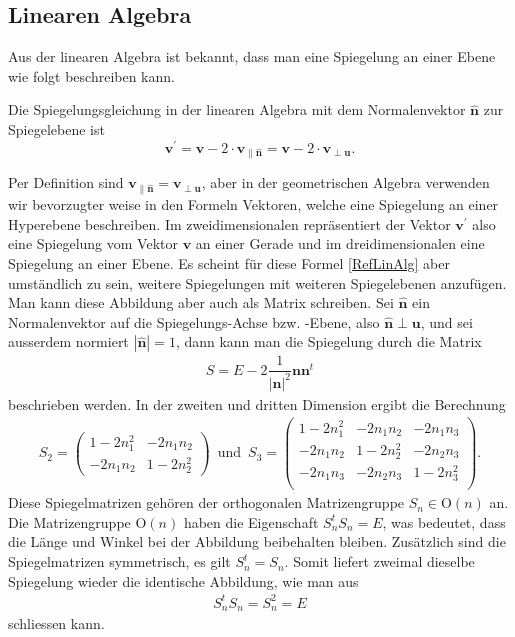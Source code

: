 \subsection{Linearen Algebra}
Aus der linearen Algebra ist bekannt, dass man eine Spiegelung an einer Ebene wie folgt beschreiben kann.
\begin{definition}
	Die Spiegelungsgleichung in der linearen Algebra mit dem Normalenvektor $\mathbf{\hat{n}}$ zur Spiegelebene ist
	\begin{equation} \label{RefLinAlg}
		\mathbf{v^{'}} = \mathbf{v} - 2 \cdot \mathbf{v_{\parallel \hat{n}}} = \mathbf{v} - 2 \cdot \mathbf{v_{\perp u}}.
	\end{equation}
\end{definition}
Per Definition sind $\mathbf{v_{\parallel \hat{n}}} = \mathbf{v_{\perp u}}$, aber in der geometrischen Algebra verwenden wir bevorzugter weise in den Formeln Vektoren, welche eine Spiegelung an einer Hyperebene beschreiben. Im zweidimensionalen repräsentiert der Vektor $\mathbf{v^{'}}$ also eine Spiegelung vom Vektor $\mathbf{v}$ an einer Gerade und im dreidimensionalen eine Spiegelung an einer Ebene.
Es scheint für diese Formel \eqref{RefLinAlg} aber umständlich zu sein, weitere Spiegelungen mit weiteren Spiegelebenen anzufügen. Man kann diese Abbildung aber auch als Matrix schreiben. Sei $\mathbf{\hat{n}}$ ein Normalenvektor auf die Spiegelungs-Achse bzw. -Ebene, also $\mathbf{\hat{n}}\perp \mathbf{u}$, und sei ausserdem normiert $|\mathbf{\hat{n}}| = 1$, dann kann man die Spiegelung durch die Matrix
\begin{align}
	S = E - 2\dfrac{1}{|\mathbf{n}|^2}\mathbf{nn}^t
\end{align}
beschrieben werden. In der zweiten und dritten Dimension ergibt die Berechnung
\begin{align} \label{Spiegelmatrizen}
	S_2 = \begin{pmatrix}
		1-2n_1^2 & -2n_1n_2 \\
		-2n_1n_2 & 1-2n_2^2
	\end{pmatrix}\enspace\text{und}\enspace
	S_3 = \begin{pmatrix}
		1-2n_1^2 & -2n_1n_2 & -2n_1n_3\\
		-2n_1n_2 & 1-2n_2^2 & -2n_2n_3\\
		-2n_1n_3 & -2n_2n_3 & 1-2n_3^2\\
	\end{pmatrix}.
\end{align}
Diese Spiegelmatrizen gehören der orthogonalen Matrizengruppe $S_n\in \text{O}(n)$ an. Die Matrizengruppe $\text{O}(n)$ haben die Eigenschaft $S_n^t S_n = E$, was bedeutet, dass die Länge und Winkel bei der Abbildung beibehalten bleiben. Zusätzlich sind die Spiegelmatrizen symmetrisch, es gilt $S_n^t = S_n$. Somit liefert zweimal dieselbe Spiegelung wieder die identische Abbildung, wie man aus
\begin{align}
	S_n^t S_n = S_n^2 = E
\end{align}
schliessen kann.

